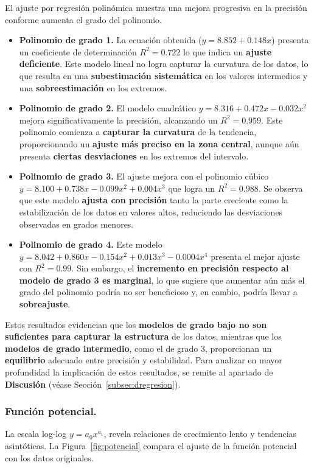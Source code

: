 \documentclass{article}
\begin{document}
El ajuste por regresión polinómica muestra una mejora progresiva en la precisión conforme aumenta el grado del polinomio. 
\begin{itemize}
    \item \textbf{Polinomio de grado 1.} La ecuación obtenida ($y = 8.852 + 0.148x$) presenta un coeficiente de determinación $R^2 = 0.722$ lo que indica un \textbf{ajuste deficiente}. Este modelo lineal no logra capturar la curvatura de los datos, lo que resulta en una \textbf{subestimación sistemática} en los valores intermedios y una \textbf{sobreestimación} en los extremos.
    \item \textbf{Polinomio de grado 2.} El modelo cuadrático $y = 8.316 + 0.472x - 0.032x^2$ mejora significativamente la precisión, alcanzando un $R^2 = 0.959$. Este polinomio comienza a \textbf{capturar la curvatura} de la tendencia, proporcionando un \textbf{ajuste más preciso en la zona central}, aunque aún presenta \textbf{ciertas desviaciones} en los extremos del intervalo.
    \item \textbf{Polinomio de grado 3.} El ajuste mejora con el polinomio cúbico $y = 8.100 + 0.738x - 0.099x^2 + 0.004x^3$ que logra un $R^2 = 0.988$. Se observa que este modelo \textbf{ajusta con precisión} tanto la parte creciente como la estabilización de los datos en valores altos, reduciendo las desviaciones observadas en grados menores.
    \item \textbf{Polinomio de grado 4.} Este modelo $y = 8.042 + 0.860x - 0.154x^2 + 0.013x^3 - 0.0004x^4$ presenta el mejor ajuste con $R^2 = 0.99$.  Sin embargo, el \textbf{incremento en precisión respecto al modelo de grado 3 es marginal}, lo que sugiere que aumentar aún más el grado del polinomio podría no ser beneficioso y, en cambio, podría llevar a \textbf{sobreajuste}.
\end{itemize}
Estos resultados evidencian que los \textbf{modelos de grado bajo no son suficientes para capturar la estructura} de los datos, mientras que los \textbf{modelos de grado intermedio}, como el de grado 3, proporcionan un \textbf{equilibrio} adecuado entre precisión y estabilidad. Para analizar en mayor profundidad la implicación de estos resultados, se remite al apartado de \textbf{Discusión} (véase Sección~\ref{subsec:dregresion}).


\subsubsection*{Función potencial.}
La escala log-log $y = a_0 x^{a_1}$, revela relaciones de crecimiento lento y tendencias asintóticas. La Figura~\ref{fig:potencial} compara el ajuste de la función potencial con los datos originales.
\end{document}
